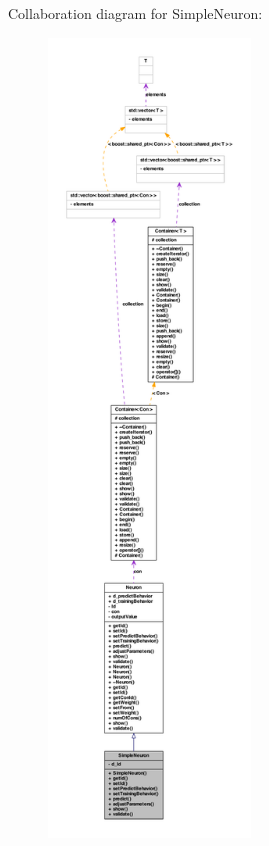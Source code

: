 Collaboration diagram for SimpleNeuron:
\nopagebreak
\begin{figure}[H]
\begin{center}
\leavevmode
\includegraphics[height=600pt]{class_simple_neuron__coll__graph}
\end{center}
\end{figure}
